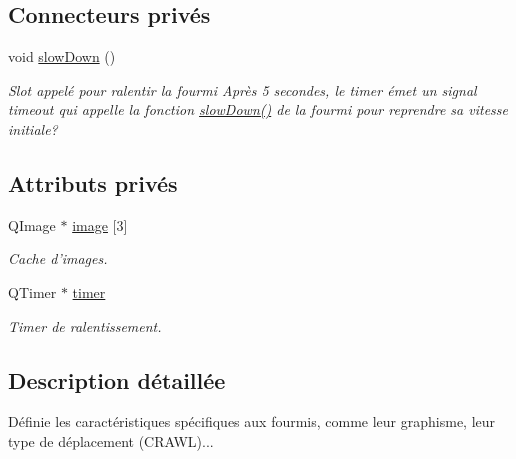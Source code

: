 \subsection*{Connecteurs privés}
\begin{DoxyCompactItemize}
\item 
\hypertarget{classAnt_a1261f3d930faf4c98f06e173203a3d72}{
void \hyperlink{classAnt_a1261f3d930faf4c98f06e173203a3d72}{slowDown} ()}
\label{classAnt_a1261f3d930faf4c98f06e173203a3d72}

\begin{DoxyCompactList}\small\item\em Slot appelé pour ralentir la fourmi Après 5 secondes, le timer émet un signal timeout qui appelle la fonction \hyperlink{classAnt_a1261f3d930faf4c98f06e173203a3d72}{slowDown()} de la fourmi pour reprendre sa vitesse initiale? \end{DoxyCompactList}\end{DoxyCompactItemize}
\subsection*{Attributs privés}
\begin{DoxyCompactItemize}
\item 
QImage $\ast$ \hyperlink{classAnt_af7d498fe6677833f371d3d9561727678}{image} \mbox{[}3\mbox{]}
\begin{DoxyCompactList}\small\item\em Cache d'images. \end{DoxyCompactList}\item 
QTimer $\ast$ \hyperlink{classAnt_a0535768a0f4cb7682a13c6cd514cf7b0}{timer}
\begin{DoxyCompactList}\small\item\em Timer de ralentissement. \end{DoxyCompactList}\end{DoxyCompactItemize}


\subsection{Description détaillée}
Définie les caractéristiques spécifiques aux fourmis, comme leur graphisme, leur type de déplacement (CRAWL)... 

